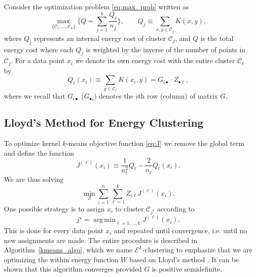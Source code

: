 \documentclass[aps,preprint,nofootinbib,floatfix]{revtex4-1}
\DeclareMathOperator*{\argmin}{arg\,min}
\newcommand\kk{K}
\newcommand\C{{\mathcal{C}}}
\begin{document}
Consider the optimization problem 
\eqref{eq:max_prob} 
written as
\begin{equation}
\label{eq:maxQ}
\max_{\{ \C_1,\dotsc,\C_k \}} 
\bigg\{ Q = \sum_{j=1}^k \dfrac{Q_j}{n_j}  \bigg\},
\qquad Q_j \equiv \sum_{x,y\in\C_j} \kk(x,y),
\end{equation}
where $Q_j$ represents an internal energy cost of cluster $\C_j$, and
$Q$ is the total energy cost where each $Q_j$ 
is weighted by the inverse
of the number of points in $\C_j$. For a data point $x_i$ we denote
its own energy cost
with the entire cluster $\C_\ell$ by
\begin{equation}
\label{eq:costxij}
Q_\ell(x_i) \equiv \sum_{y\in\C_\ell} \kk(x_i, y) = 
G_{i \bullet} \cdot Z_{\bullet \ell},
\end{equation}
where we recall that $G_{i\bullet}$ ($G_{\bullet i}$) denotes
the $i$th row (column) of matrix $G$.


\subsection*{Lloyd's Method for Energy Clustering}

To optimize kernel $k$-means objective function
\eqref{eq:J} we remove the global term and define the function
\begin{equation}
\label{eq:Jell}
J^{(\ell)}(x_i) \equiv 
\dfrac{1}{n_\ell^2} Q_\ell
-\dfrac{2}{n_\ell} Q_\ell(x_i) .
\end{equation}
We are thus solving 
\begin{equation}
\min_{Z} 
\sum_{i=1}^n 
\sum_{\ell=1}^k Z_{i\ell} J^{(\ell)}(x_i).
\end{equation}
One possible strategy is to
assign  $x_i$ to cluster $\C_{j^\star}$ according
to 
\begin{equation}
j^\star = \argmin_{\ell=1,\dotsc,k} J^{(\ell)}(x_i) .
\end{equation}
This is done for every data point $x_i$ and repeated until
convergence, i.e. until no new assignments are made.
The entire procedure is described in Algorithm~\ref{kmeans_algo}, which
we name $\mathcal{E}^L$-clustering to emphasize
that we are optimizing the within energy function $W$ 
based on Lloyd's method \cite{Lloyd}.
It can be shown that this algorithm converges provided $G$ is positive
semidefinite. 
\end{document}
